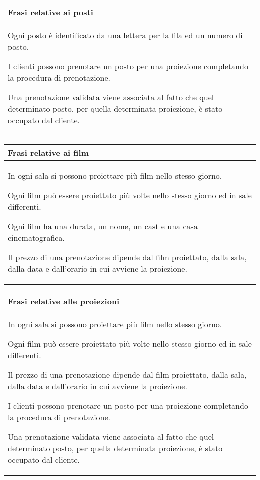 \begin{tabularx}{\linewidth}{|X|}
      \hline
      \rowcolor{tblhdrcolor}
      \textbf{Frasi relative ai posti} \\\hline
      Ogni posto è identificato da una lettera per la fila ed un numero
      di posto.

      I clienti possono prenotare un posto per una proiezione completando la
      procedura di prenotazione.

      Una prenotazione validata viene associata al fatto che quel determinato
      posto, per quella determinata proiezione, è stato occupato dal cliente.
      \\ \hline
\end{tabularx}

\begin{tabularx}{\linewidth}{|X|}
      \hline
      \rowcolor{tblhdrcolor}
      \textbf{Frasi relative ai film} \\\hline
      In ogni sala si possono proiettare più film nello stesso giorno.

      Ogni film può essere proiettato più volte nello stesso giorno ed
      in sale differenti.

      Ogni film ha una durata, un nome, un cast e una
      casa cinematografica.

      Il prezzo di una prenotazione dipende dal film proiettato, dalla
      sala, dalla data e dall'orario in cui avviene la proiezione.
      \\ \hline
\end{tabularx}

\begin{tabularx}{\linewidth}{|X|}
      \hline
      \rowcolor{tblhdrcolor}
      \textbf{Frasi relative alle proiezioni} \\\hline
      In ogni sala si possono proiettare più film nello stesso giorno.

      Ogni film può essere proiettato più volte nello stesso giorno ed in sale
      differenti.

      Il prezzo di una prenotazione dipende dal film proiettato, dalla
      sala, dalla data e dall'orario in cui avviene la proiezione.

      I clienti possono prenotare un posto per una proiezione
      completando la procedura di prenotazione.

      Una prenotazione validata viene associata al fatto che quel
      determinato posto, per quella determinata proiezione,
      è stato occupato dal cliente.
      \\ \hline
\end{tabularx}

